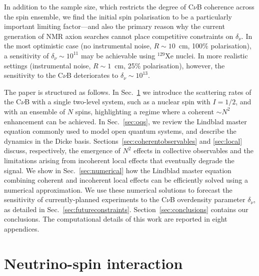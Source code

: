 \documentclass[aps,prd,10pt,twocolumn,superscriptaddress,floatfix,nofootinbib,amsmath,amssymb,altaffilletter,preprintnumbers]{revtex4-1}
\begin{document}
In addition to the sample size, which restricts the degree of C$\nu$B coherence across the spin ensemble, we find the initial spin polarisation to be a particularly important limiting factor---and also the primary reason why the current generation of NMR axion searches cannot place competitive constraints on $\delta_\nu$.  In the most optimistic case (no instrumental noise, $R \sim 10$~cm, 100\% polarisation), a sensitivity of $\delta_\nu \sim 10^{11}$ may be achievable using $^{129}$Xe nuclei. In more realistic settings (instrumental noise, $R \sim 1$~cm, 25\% polarisation), however, the sensitivity to the C$\nu$B deteriorates to $\delta_\nu \sim 10^{13}$. 

The paper is structured as follows. In Sec.~\ref{sec:nuspin} we introduce the scattering rates of the C$\nu$B with a single two-level system, such as a nuclear spin with $I=1/2$, and with an ensemble of $N$ spins, highlighting a regime where a coherent $\sim N^2$ enhancement can be achieved. In Sec.~\ref{sec:oqs}, we review the Lindblad master equation commonly used to model open quantum systems, and describe the dynamics in the Dicke basis. Sections~\ref{sec:coherentobservables} and \ref{sec:local} discuss, respectively, the emergence of $N^2$ effects in collective observables and the limitations arising from incoherent local effects that eventually degrade the signal.  We show in Sec.~\ref{sec:numerical} how the Lindblad master equation combining coherent and incoherent local effects can be efficiently solved using a numerical approximation. We use these numerical solutions to forecast the sensitivity of currently-planned experiments to the C$\nu$B overdensity parameter $\delta_\nu$, as detailed in Sec.~\ref{sec:futureconstraints}.  Section~\ref{sec:conclusions} contains our conclusions.  The computational details of this work are reported in eight appendices.




\section{Neutrino-spin interaction}\label{sec:nuspin}
\end{document}
